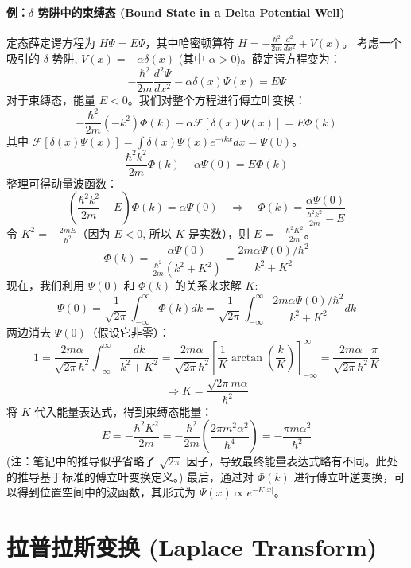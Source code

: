\documentclass{article}
\begin{document}
	\paragraph{例：$\delta$ 势阱中的束缚态 (Bound State in a Delta Potential Well)}
	定态薛定谔方程为 $H\Psi = E\Psi$，其中哈密顿算符 $H = -\frac{\hbar^2}{2m}\frac{d^2}{dx^2} + V(x)$。
	考虑一个吸引的 $\delta$ 势阱, $V(x) = -\alpha \delta(x)$ (其中 $\alpha > 0$)。薛定谔方程变为：
	$$ 
	-\frac{\hbar^2}{2m}\frac{d^2\Psi}{dx^2} - \alpha\delta(x)\Psi(x) = E\Psi 
	$$
	对于束缚态，能量 $E<0$。我们对整个方程进行傅立叶变换：
	$$ 
	-\frac{\hbar^2}{2m}(-k^2)\Phi(k) - \alpha \mathcal{F}[\delta(x)\Psi(x)] = E \Phi(k) 
	$$
	其中 $\mathcal{F}[\delta(x)\Psi(x)] = \int \delta(x)\Psi(x)e^{-ikx}dx = \Psi(0)$。
	$$ 
	\frac{\hbar^2 k^2}{2m}\Phi(k) - \alpha\Psi(0) = E\Phi(k) 
	$$
	整理可得动量波函数：
	$$ 
	\left(\frac{\hbar^2 k^2}{2m} - E\right) \Phi(k) = \alpha\Psi(0) \quad \Rightarrow \quad \Phi(k) = \frac{\alpha\Psi(0)}{\frac{\hbar^2k^2}{2m} - E} 
	$$
	令 $K^2 = -\frac{2mE}{\hbar^2}$（因为 $E<0$, 所以 $K$ 是实数），则 $E = -\frac{\hbar^2 K^2}{2m}$。
	$$ 
	\Phi(k) = \frac{\alpha\Psi(0)}{\frac{\hbar^2}{2m}(k^2+K^2)} = \frac{2m\alpha\Psi(0)/\hbar^2}{k^2+K^2} 
	$$
	现在，我们利用 $\Psi(0)$ 和 $\Phi(k)$ 的关系来求解 $K$:
	$$ 
	\Psi(0) = \frac{1}{\sqrt{2\pi}} \int_{-\infty}^{\infty} \Phi(k) dk = \frac{1}{\sqrt{2\pi}} \int_{-\infty}^{\infty} \frac{2m\alpha\Psi(0)/\hbar^2}{k^2+K^2} dk 
	$$
	两边消去 $\Psi(0)$（假设它非零）：
	$$ 
	1 = \frac{2m\alpha}{\sqrt{2\pi}\hbar^2} \int_{-\infty}^{\infty} \frac{dk}{k^2+K^2} = \frac{2m\alpha}{\sqrt{2\pi}\hbar^2} \left[ \frac{1}{K}\arctan\left(\frac{k}{K}\right) \right]_{-\infty}^{\infty} = \frac{2m\alpha}{\sqrt{2\pi}\hbar^2} \frac{\pi}{K} 
	$$
	$$ 
	\Rightarrow K = \frac{\sqrt{2\pi}m\alpha}{\hbar^2} 
	$$
	将 $K$ 代入能量表达式，得到束缚态能量：
	$$ 
	E = -\frac{\hbar^2 K^2}{2m} = -\frac{\hbar^2}{2m} \left( \frac{2\pi m^2 \alpha^2}{\hbar^4} \right) = -\frac{\pi m \alpha^2}{\hbar^2} 
	$$
	(注：笔记中的推导似乎省略了 $\sqrt{2\pi}$ 因子，导致最终能量表达式略有不同。此处的推导基于标准的傅立叶变换定义。)
	最后，通过对 $\Phi(k)$ 进行傅立叶逆变换，可以得到位置空间中的波函数，其形式为 $\Psi(x) \propto e^{-K|x|}$。
	
	\section*{拉普拉斯变换 (Laplace Transform)}
	
\end{document}
